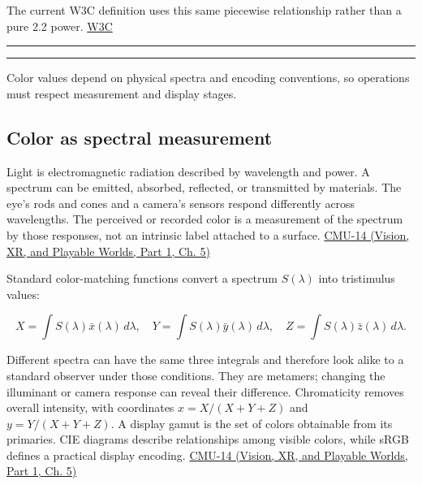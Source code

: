 The current W3C definition uses this same piecewise relationship rather than a pure 2.2 power. \href{https://www.w3.org/TR/2026/CRD-css-color-4-20261009/?utm_source=chatgpt.com}{W3C}

\begin{center}\rule{0.5\linewidth}{0.5pt}\end{center}

\begin{center}\rule{0.5\linewidth}{0.5pt}\end{center}

Color values depend on physical spectra and encoding conventions, so operations must respect measurement and display stages.

\subsection{Color as spectral measurement}\label{03-visual-computing-i-ch004-color-as-spectral-measurement}

\hypertarget{03-visual-computing-i-ch004-color-as-spectral-measurement}{}

Light is electromagnetic radiation described by wavelength and power. A spectrum can be emitted, absorbed, reflected, or transmitted by materials. The eye's rods and cones and a camera's sensors respond differently across wavelengths. The perceived or recorded color is a measurement of the spectrum by those responses, not an intrinsic label attached to a surface. \href{../07-Vision-XR-and-Playable-Worlds-P01/main.pdf\#nameddest=04-visual-computing-ii-ch036-cmu-14---color}{CMU-14 (Vision, XR, and Playable Worlds, Part 1, Ch. 5)}

Standard color-matching functions convert a spectrum \(S(\lambda)\) into tristimulus values:

\[
X=\int S(\lambda)\bar x(\lambda)\,d\lambda,\quad
Y=\int S(\lambda)\bar y(\lambda)\,d\lambda,\quad
Z=\int S(\lambda)\bar z(\lambda)\,d\lambda.
\]

Different spectra can have the same three integrals and therefore look alike to a standard observer under those conditions. They are metamers; changing the illuminant or camera response can reveal their difference. Chromaticity removes overall intensity, with coordinates \(x=X/(X+Y+Z)\) and \(y=Y/(X+Y+Z)\). A display gamut is the set of colors obtainable from its primaries. CIE diagrams describe relationships among visible colors, while sRGB defines a practical display encoding. \href{../07-Vision-XR-and-Playable-Worlds-P01/main.pdf\#nameddest=04-visual-computing-ii-ch036-cmu-14---color}{CMU-14 (Vision, XR, and Playable Worlds, Part 1, Ch. 5)}

